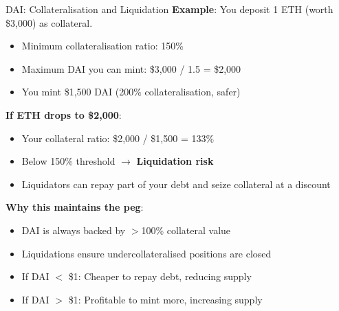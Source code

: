 \documentclass[10pt]{beamer}
\newcommand{\highlight}[1]{\textcolor{AccentOrange}{\textbf{#1}}}
\begin{document}
\begin{frame}{DAI: Collateralisation and Liquidation}
  \textbf{Example}: You deposit 1 ETH (worth \$3,000) as collateral.
    \begin{itemize}
    \item Minimum collateralisation ratio: 150\%
    \item Maximum DAI you can mint: \$3,000 / 1.5 = \$2,000
    \item You mint \$1,500 DAI (200\% collateralisation, safer)
  \end{itemize}
  
  \vspace{1em}
  \textbf{If ETH drops to \$2,000}:
  \begin{itemize}
    \item Your collateral ratio: \$2,000 / \$1,500 = 133\%
    \item Below 150\% threshold $\rightarrow$ \highlight{Liquidation risk}
    \item Liquidators can repay part of your debt and seize collateral at a discount
  \end{itemize}
  
  \vspace{1em}
  \textbf{Why this maintains the peg}:
  \begin{itemize}
    \item DAI is always backed by $>$100\% collateral value
    \item Liquidations ensure undercollateralised positions are closed
    \item If DAI $<$ \$1: Cheaper to repay debt, reducing supply
    \item If DAI $>$ \$1: Profitable to mint more, increasing supply
  \end{itemize}
\end{frame}
\end{document}
